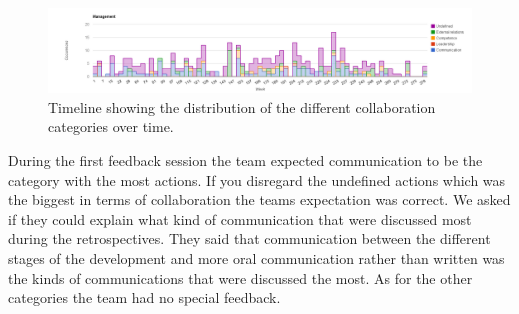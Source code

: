 \begin{table}[!h]
	\begin{center}
	\caption{Results from the content analysis regarding the collaboration influences of an action.}
	\label{table:collaboration-results}
	\end{center}
\end{table}

\begin{figure}
	\centering
	\includegraphics[width=\textwidth, keepaspectratio]{figures/management-l.png}
	\caption{Timeline showing the distribution of the different collaboration categories over time.}
	\label{figure-management-l}
\end{figure}

During the first feedback session the team expected communication to be the category with the most actions. If you disregard the undefined actions which was the biggest in terms of collaboration the teams expectation was correct. We asked if they could explain what kind of communication that were discussed most during the retrospectives. They said that communication between the different stages of the development and more oral communication rather than written was the kinds of communications that were discussed the most. As for the other categories the team had no special feedback.

